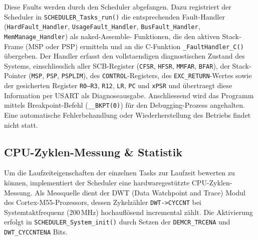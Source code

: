 Diese Faults werden durch den Scheduler abgefangen. Dazu registriert der Scheduler in \texttt{SCHEDULER\_\allowbreak Tasks\_run()} die entsprechenden Fault-Handler (\texttt{HardFault\_Handler}, \linebreak \texttt{UsageFault\_Handler}, \texttt{Bus\allowbreak Fault\_Handler},  \texttt{MemManage\_Handler}) als naked-Assemble- \linebreak Funktionen, die den aktiven \allowbreak Stack-Frame (MSP oder PSP) ermitteln und an die C-Funktion \texttt{\_FaultHandler\_C()} übergeben. Der Handler erfasst den vollstaendigen diagnostischen Zustand des Systems, einschliesslich aller SCB-Register (\texttt{CFSR}, \texttt{HFSR}, \texttt{MMFAR}, \texttt{BFAR}), der Stack-Pointer (\texttt{MSP}, \texttt{PSP}, \texttt{PSPLIM}), des \texttt{CONTROL}-Registers, des \texttt{EXC\_RETURN}-Wertes sowie der gesicherten Register \texttt{R0--R3}, \texttt{R12}, \texttt{LR}, \texttt{PC} und \texttt{xPSR} und übertraegt diese Information per USART als Diagnoseausgabe. Anschliessend wird das Programm mittels Breakpoint-Befehl (\texttt{\_\_BKPT(0)}) für den Debugging-Prozess angehalten. Eine automatische Fehlerbehandlung oder Wiederherstellung des Betriebs findet nicht statt.

\subsection{CPU-Zyklen-Messung \& Statistik}\label{sub:cpu-statistik}

Um die Laufzeiteigenschaften der einzelnen Tasks zur Laufzeit bewerten zu können, implementiert der Scheduler eine hardwaregestützte CPU-Zyklen-Messung. Als Messquelle dient der DWT (Data Watchpoint and Trace) Modul des Cortex-M55-Prozessors, dessen Zykelzähler \texttt{DWT->CYCCNT} bei Systemtaktfrequenz (200\,MHz) hochauflösend incremental zählt. Die Aktivierung erfolgt in \texttt{SCHEDULER\_System\_init()} durch Setzen der \texttt{DEMCR\_TRCENA} und \linebreak \texttt{DWT\_CYCCNTENA} Bits.

